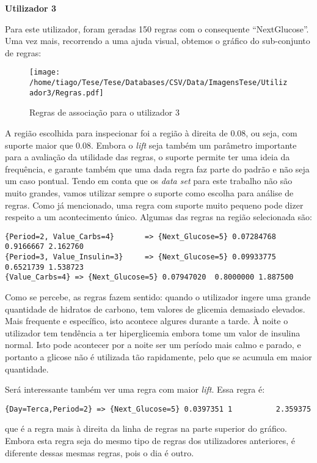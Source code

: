 \textbf{Utilizador 3}

Para este utilizador, foram geradas 150 regras com o consequente ``Next\textunderscore Glucose''. Uma vez mais, recorrendo a uma ajuda visual, obtemos o gráfico do sub-conjunto de regras:


\begin{figure}[H]
\centering
\texttt{[image: /home/tiago/Tese/Tese/Databases/CSV/Data/ImagensTese/Utilizador3/Regras.pdf]}
\caption{Regras de associação para o utilizador 3}
\end{figure}
A região escolhida para inspecionar foi a região à direita de 0.08, ou seja, com suporte maior que 0.08. Embora o \textit{lift} seja também um parâmetro importante para a avaliação da utilidade das regras, o suporte permite ter uma ideia da frequência, e garante também que uma dada regra faz parte do padrão e não seja um caso pontual. Tendo em conta que os \textit{data set} para este trabalho não são muito grandes, vamos utilizar sempre o suporte como escolha para análise de regras. Como já mencionado, uma regra com suporte muito pequeno pode dizer respeito a um acontecimento único. Algumas das regras na região selecionada são:

\begin{lstlisting}
{Period=2, Value_Carbs=4}       => {Next_Glucose=5} 0.07284768  0.9166667 2.162760  
{Period=3, Value_Insulin=3}     => {Next_Glucose=5} 0.09933775  0.6521739 1.538723
{Value_Carbs=4} => {Next_Glucose=5} 0.07947020  0.8000000 1.887500
\end{lstlisting}
Como se percebe, as regras fazem sentido: quando o utilizador ingere uma grande quantidade de hidratos de carbono, tem valores de glicemia demasiado elevados. Mais frequente e específico, isto acontece algures durante a tarde. À noite o utilizador tem tendência a ter hiperglicemia embora tome um valor de insulina normal. Isto pode acontecer por a noite ser um período mais calmo e parado, e portanto a glicose não é utilizada tão rapidamente, pelo que se acumula em maior quantidade. 

Será interessante também ver uma regra com maior \textit{lift}. Essa regra é:

\begin{lstlisting}
{Day=Terca,Period=2} => {Next_Glucose=5} 0.0397351 1          2.359375
\end{lstlisting}
que é a regra mais à direita da linha de regras na parte superior do gráfico. Embora esta regra seja do mesmo tipo de regras dos utilizadores anteriores, é diferente dessas mesmas regras, pois o dia é outro. 

